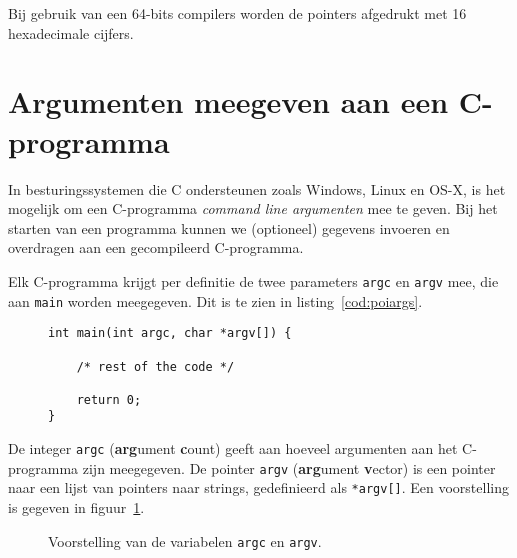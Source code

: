 Bij gebruik van een 64-bits compilers worden de pointers afgedrukt met 16 hexadecimale cijfers.


\section{Argumenten meegeven aan een C-programma}
\label{sec:argumentenmeegevenaaneencprogramma}
In besturingssystemen die C ondersteunen zoals Windows, Linux en OS-X, is het mogelijk om een C-programma \textsl{command line argumenten} mee te geven. Bij het starten van een programma kunnen we (optioneel) gegevens invoeren en overdragen aan een gecompileerd C-programma.

Elk C-programma krijgt per definitie de twee parameters \texttt{argc} en \texttt{argv} mee, die aan \texttt{main} worden meegegeven. Dit is te zien in listing~\ref{cod:poiargs}.

\begin{figure}[!ht]
\begin{lstlisting}[caption=Definitie van de command line parameters.,label=cod:poiargs]
int main(int argc, char *argv[]) {

    /* rest of the code */
    
    return 0;
}
\end{lstlisting}
\end{figure}

De integer \texttt{argc} (\textbf{arg}ument \textbf{c}ount) geeft aan hoeveel argumenten aan het C-programma zijn meegegeven. De pointer \texttt{argv} (\textbf{arg}ument \textbf{v}ector) is  een pointer naar een lijst van pointers naar strings, gedefinieerd als \texttt{*argv[]}. 
Een voorstelling is gegeven in figuur~\ref{fig:poiargcargv}.

\begin{figure}[!ht]
\centering
{}
\caption{Voorstelling van de variabelen \texttt{argc} en \texttt{argv}.}
\label{fig:poiargcargv}
\end{figure}

